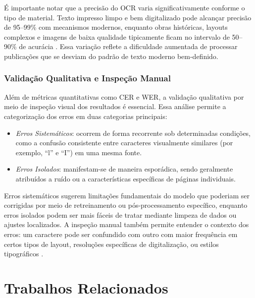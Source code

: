 \documentclass[
  12pt,
  oneside,
  a4paper,
  chapter=TITLE,
  section=TITLE,
  english,
  brazil
]{abntex2}
\begin{document}
É importante notar que a precisão do OCR varia significativamente conforme o tipo de
material. Texto impresso limpo e bem digitalizado pode alcançar precisão de 95--99\% com
mecanismos modernos, enquanto obras históricas, layouts complexos e imagens de baixa
qualidade tipicamente ficam no intervalo de 50--90\% de acurácia \cite{PictureText2025}.
Essa variação reflete a dificuldade aumentada de processar publicações que se desviam do
padrão de texto moderno bem-definido.

\subsection{Validação Qualitativa e Inspeção Manual}

Além de métricas quantitativas como CER e WER, a validação qualitativa por meio de
inspeção visual dos resultados é essencial. Essa análise permite a categorização dos
erros em duas categorias principais:

\begin{itemize}
    \item \textit{Erros Sistemáticos}: ocorrem de forma recorrente sob determinadas
    condições, como a confusão consistente entre caracteres visualmente similares (por
    exemplo, ``l'' e ``I'') em uma mesma fonte.

    \item \textit{Erros Isolados}: manifestam-se de maneira esporádica, sendo geralmente
    atribuídos a ruído ou a características específicas de páginas individuais.
\end{itemize}

Erros sistemáticos sugerem limitações fundamentais do modelo que poderiam ser corrigidas
por meio de retreinamento ou pós-processamento específico, enquanto erros isolados podem
ser mais fáceis de tratar mediante limpeza de dados ou ajustes localizados. A inspeção
manual também permite entender o contexto dos erros: um caractere pode ser confundido com
outro com maior frequência em certos tipos de layout, resoluções específicas de
digitalização, ou estilos tipográficos \cite{EmergenMind2025}.

\chapter{Trabalhos Relacionados}
\end{document}
